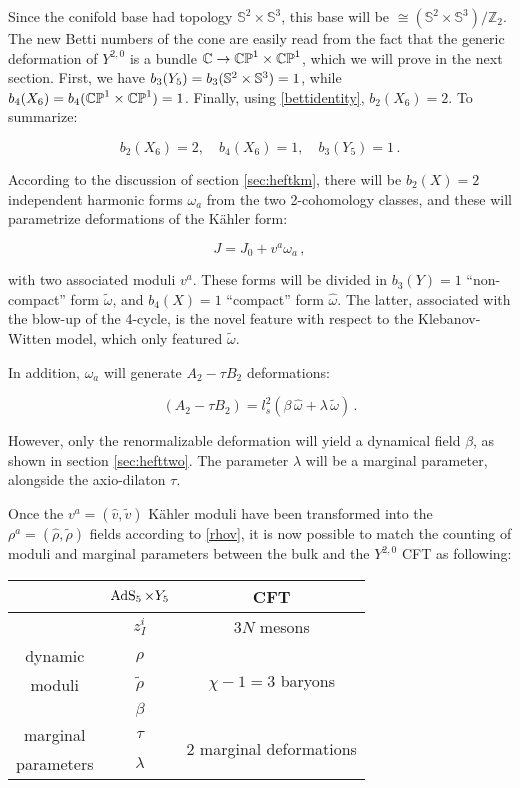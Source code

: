 Since the conifold base had topology $\mathbb{S}^2 \times \mathbb{S}^3$\cite{Candelas}, this base will be $\cong (\mathbb{S}^2 \times \mathbb{S}^3)/\mathbb{Z}_2$. The new Betti numbers of the cone are easily read from the fact that the generic deformation of $Y^{2,0}$ is a bundle $\mathbb{C} \rightarrow \mathbb{CP}^1 \times \mathbb{CP}^1$, which we will prove in the next section. First, we have $b_3(Y_5) = b_3(\mathbb{S}^2 \times \mathbb{S}^3) = 1$, while $b_4(X_6) = b_4(\mathbb{CP}^1 \times \mathbb{CP}^1) = 1$. Finally, using \eqref{bettidentity}, $b_2(X_6) = 2$. To summarize:

\begin{equation}
	b_2(X_6) = 2,\quad b_4(X_6) = 1,\quad b_3(Y_5) = 1\,.
	\label{}
\end{equation}


According to the discussion of section \ref{sec:heftkm}, there will be $b_2(X) = 2$ independent harmonic forms $\omega_a$ from the two 2-cohomology classes, and these will parametrize deformations of the K\"ahler form:

\begin{equation}
	J = J_0 + v^a \omega_a\,,
	\label{}
\end{equation}

with two associated moduli $v^a$. These forms will be divided in $b_3(Y) = 1$ ``non-compact'' form $\tilde\omega$, and $b_4(X) = 1$ ``compact'' form $\hat \omega$. The latter, associated with the blow-up of the 4-cycle, is the novel feature with respect to the Klebanov-Witten model, which only featured $\tilde\omega$.

In addition, $\omega_a$ will generate $A_2 - \tau B_2$ deformations:

\begin{equation}
	(A_2 - \tau B_2) = l_s^2 \left( \beta \, \hat \omega + \lambda \, \tilde \omega \right) \,.
	\label{}
\end{equation}

However, only the renormalizable deformation will yield a dynamical field $\beta$, as shown in section \ref{sec:hefttwo}. The parameter $\lambda$ will be a marginal parameter, alongside the axio-dilaton $\tau$.

Once the $v^a = (\hat v, \tilde v)$ K\"ahler moduli have been transformed into the $\rho^a = (\hat \rho, \tilde \rho)$ fields according to \eqref{rhov}, it is now possible to match the counting of moduli and marginal parameters between the bulk and the $Y^{2,0}$ CFT as following:

\begin{center}
\begin{tabular}{ccc}
	 		& $\operatorname{AdS}_{5} \times Y_5$ & CFT \\ \midrule \midrule
			& $ z_I^i$ & $3N$ mesons\\ \cmidrule{2-3} 
dynamic 		& $\hat \rho$ & \multirow{3}{*}{$\chi-1 = 3$ baryons} \\
moduli			& $\tilde \rho$ & \\
			& $ \beta$ & \\ \midrule
marginal	& $\tau$ 	&  \multirow{2}{*}{$2$ marginal deformations}	\\
parameters			& $\lambda$ &	
\end{tabular}
\end{center}


